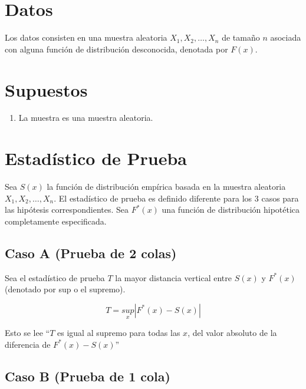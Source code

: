 \documentclass[
  a4paper,
  oneside,
  openany]{book}
\providecommand{\tightlist}{%
  \setlength{\itemsep}{0pt}\setlength{\parskip}{0pt}}
\begin{document}
\hypertarget{datos-15}{%
\section{Datos}\label{datos-15}}

Los datos consisten en una muestra aleatoria \(X_{1},X_{2},\ldots,X_{n}\) de tamaño \(n\) asociada con alguna función de distribución desconocida, denotada por \(F(x)\).

\hypertarget{supuestos-13}{%
\section{Supuestos}\label{supuestos-13}}

\begin{enumerate}
\def\labelenumi{\arabic{enumi})}
\tightlist
\item
  La muestra es una muestra aleatoria.
\end{enumerate}

\hypertarget{estaduxedstico-de-prueba-14}{%
\section{Estadístico de Prueba}\label{estaduxedstico-de-prueba-14}}

Sea \(S(x)\) la función de distribución empírica basada en la muestra aleatoria \(X_{1},X_{2},\ldots,X_{n}\). El estadístico de prueba es definido diferente para los 3 casos para las hipótesis correspondientes. Sea \(F^*(x)\) una función de distribución hipotética completamente especificada.

\hypertarget{caso-a-prueba-de-2-colas}{%
\subsection*{Caso A (Prueba de 2 colas)}\label{caso-a-prueba-de-2-colas}}


Sea el estadístico de prueba \(T\) la mayor distancia vertical entre \(S(x)\) y \(F^*(x)\)(denotado por sup o el supremo).

\[T=\underset{x}{sup}|F^*(x)-S(x)|\]

Esto se lee ``\(T\) es igual al supremo para todas las \(x\), del valor absoluto de la diferencia de \(F^*(x)-S(x)\)''

\hypertarget{caso-b-prueba-de-1-cola}{%
\subsection*{Caso B (Prueba de 1 cola)}\label{caso-b-prueba-de-1-cola}}
\end{document}
